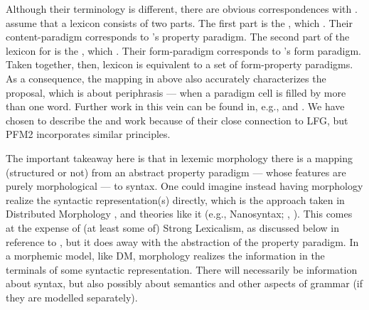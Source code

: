 \documentclass[output=paper,hidelinks]{langscibook}
\begin{document}
\begin{sloppypar}
  \noindent Although their terminology is different, there are obvious
  correspondences with \citet{spencer13}. \citet{ackerman;stump04}
  assume that a lexicon consists of two parts. The first part is the
  , which . Their content-paradigm corresponds to
  \citeauthor{spencer13}'s property paradigm. The second part of the
  lexicon for \citet{ackerman;stump04} is the , which
  . Their form-paradigm
  corresponds to \citeauthor{spencer13}'s form paradigm. Taken
  together, then,  lexicon is equivalent
  to a set of  form-property paradigms. As a
  consequence, the mapping in  above also
  accurately characterizes the \citet{ackerman;stump04} proposal,
  which is about periphrasis --- when a paradigm cell is filled by 
  more than one word. Further work in this vein can be found in, e.g., 
  \citet{AckermanStumpWebelhuth2011} and \citet{Spencer15}. We have chosen to
  describe the \citet{spencer13} and \citet{ackerman;stump04} work because
  of their close connection to LFG, but PFM2 \citep{stump16} incorporates similar principles. 
\end{sloppypar}

The important takeaway here is that in lexemic morphology
there is a mapping (structured or not) from an abstract property
paradigm --- whose features are purely morphological --- to
syntax. One could imagine instead having morphology realize the
syntactic representation(s) directly, which is the approach taken in
Distributed Morphology \citep[DM;][]{hallemarantz}, and theories
like it (e.g., Nanosyntax; \citealt{Sta09}, \citealt{caha09}). This
comes at the expense of (at least some of) Strong Lexicalism, as
discussed below in reference to , but it does away with the
abstraction of the property paradigm. In a morphemic model, like DM,
morphology realizes the information in the terminals of some syntactic
representation. There will necessarily be information about syntax,
but also possibly about semantics and other aspects of grammar (if
they are modelled separately).


\end{document}
